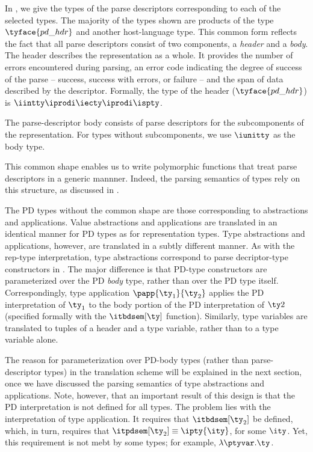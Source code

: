 In , we give the types of the parse descriptors
corresponding to each of the selected \ddc{} types. The majority of
the types shown are products of the type $\tyface{pd\_hdr}$ and
another host-language type. This common form reflects the fact that all
parse descriptors consist of two components, a {\it header} and a {\it
  body}.  The header describes the representation as a whole. It
provides the number of errors encountered during parsing, an error
code indicating the degree of success of the parse -- success, success
with errors, or failure -- and the span of data described by the
descriptor.  Formally, the type of the header ($\tyface{pd\_hdr}$) is
$\iintty \iprodi \iecty \iprodi \ispty$. 

The parse-descriptor body consists of parse descriptors for the
subcomponents of the representation. For types without subcomponents,
we use $\iunitty$ as the body type.


This common shape enables us to write
polymorphic functions that treat parse descriptors in a generic
mannner. Indeed, the parsing semantics of types rely on this
structure, as discussed in .

The PD types without the common shape are those corresponding to
abstractions and applications. Value abstractions and applications are
translated in an identical manner for PD types as for representation
types.  Type abstractions and applications, however, are translated in
a subtly different manner. As with the rep-type interpretation, type
abstractions correspond to parse decriptor-type constructors in
\fomega. The major difference is that PD-type constructors are
parameterized over the PD \emph{body} type, rather than over the PD
type itself. Correspondingly, type application $\papp {\ty_1}{\ty_2}$ applies
the PD interpretation of $\ty_1$ to the body portion of the PD
interpretation of $\ty2$ (specified formally with the $\itbdsem[\ty]$
function). Similarly, type variables are translated to tuples of a
header and a type variable, rather than to a type variable alone. 

The reason for parameterization over PD-body types (rather than
parse-descriptor types) in the translation scheme will be explained in
the next section, once we have discussed the parsing semantics of type
abstractions and applications. Note, however, that an important result
of this design is that the PD interpretation is not defined for all
types. The problem lies with the interpretation of type application.
It requires that $\itbdsem[\ty_2]$ be defined, which, in turn,
requires that $\itpdsem[\ty_2] \equiv \ipty{\ity}$, for some $\ity$.
Yet, this requirement is not mebt by some types; for example, $\lambda
\ptyvar.\ty$.



